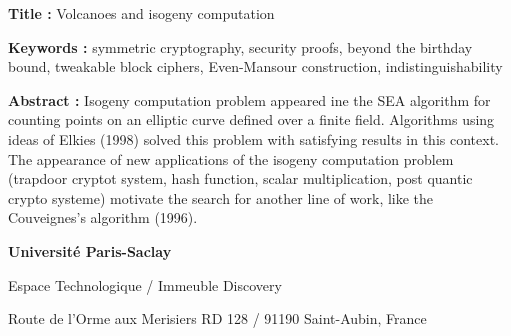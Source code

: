 \documentclass[a4paper, titlepage, 12pt]{book}
\newcommand{\titreeng}{Volcanoes and isogeny computation}
\begin{document}

\begin{breakbox}

\noindent\textbf{Title : }\titreeng

\vspace{2ex}

\noindent\textbf{Keywords : }symmetric cryptography, security proofs, beyond the birthday bound, 
tweakable block ciphers, Even-Mansour construction, indistinguishability

\begin{multicols}{2}
\noindent\textbf{Abstract : }
Isogeny computation problem appeared ine the SEA algorithm for counting points on an elliptic curve defined over a finite field. Algorithms using ideas of Elkies (1998) solved this problem with satisfying results in this context. The appearance of new applications of the isogeny computation problem (trapdoor cryptot system, hash function, scalar multiplication, post quantic crypto systeme) motivate the search for another line of work, like the Couveignes's algorithm (1996).
\end{multicols}
\end{breakbox}


{\tiny
\noindent
\textbf{Université Paris-Saclay}

\noindent
Espace Technologique / Immeuble Discovery

\noindent
Route de l’Orme aux Merisiers RD 128 / 91190 Saint-Aubin, France 

}
\end{document}
